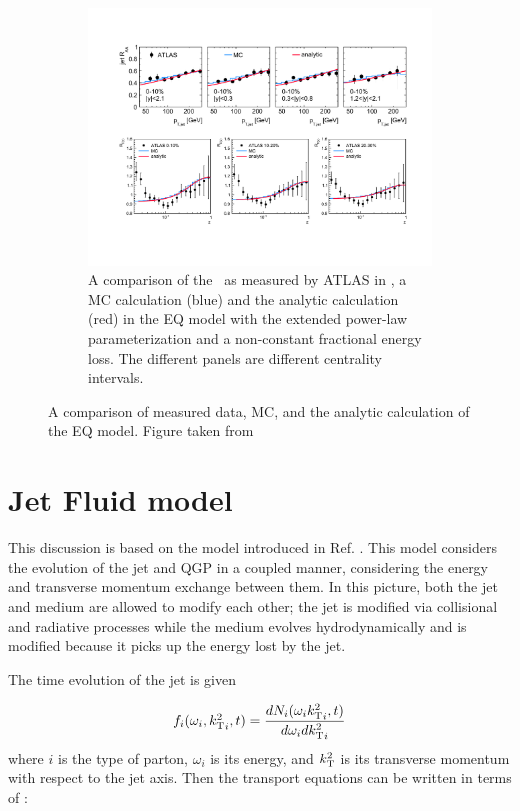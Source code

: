 \begin{figure}
\begin{subfigure}{1\textwidth}
\includegraphics[width=1\textwidth]{figures/jetMeasurements/eq_FF}
\caption{A comparison of the \Rdz\ as measured by ATLAS in \cite{Aad:2014wha}, a MC calculation (blue) and the analytic calculation (red) in the EQ model with the extended power-law parameterization and a non-constant fractional energy loss. The different panels are different centrality intervals.}
\label{fig:EQ_FF}
\end{subfigure}
\caption{A comparison of measured data, MC, and the analytic calculation of the EQ model. Figure taken from \cite{Spousta:2015fca}}
\label{fig:EQ_modification}
\end{figure}




\section{Jet Fluid model}
This discussion is based on the model introduced in Ref. \cite{Tachibana:2017syd}. This model considers the evolution of the jet and QGP in a coupled manner, considering the energy and transverse momentum exchange between them. In this picture, both the jet and medium are allowed to modify each other; the jet is modified via collisional and radiative processes while the medium evolves hydrodynamically and is modified because it picks up the energy lost by the jet. 

The time evolution of the jet is given 

\begin{align}
f_i (\omega_i, \mbox{$k_{\rm T}^2$}_i, t) = \frac{dN_i (\omega_i \mbox{$k_{\rm T}^2$}_i, t)}{d \omega_i d\mbox{$k_{\rm T}^2$}_i}
\end{align}
where $i$ is the type of parton, $\omega_i$ is its energy, and $\mbox{$k_{\rm T}^2$}$ is its transverse momentum with respect to the jet axis. Then the transport equations can be written in terms of :

